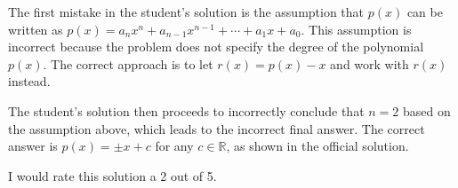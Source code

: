 The first mistake in the student's solution is the assumption that $p(x)$ can be written as $p(x) = a_n x^n + a_{n-1} x^{n-1} + \cdots + a_1 x + a_0$. This assumption is incorrect because the problem does not specify the degree of the polynomial $p(x)$. The correct approach is to let $r(x) = p(x) - x$ and work with $r(x)$ instead.

The student's solution then proceeds to incorrectly conclude that $n=2$ based on the assumption above, which leads to the incorrect final answer. The correct answer is $p(x) = \pm x + c$ for any $c \in \mathbb{R}$, as shown in the official solution.

I would rate this solution a 2 out of 5.
